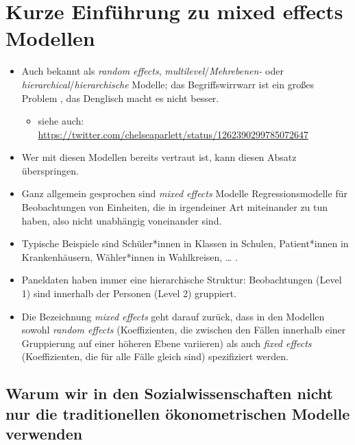 \documentclass[
]{book}
\providecommand{\tightlist}{%
  \setlength{\itemsep}{0pt}\setlength{\parskip}{0pt}}
\begin{document}
\hypertarget{kurze-einfuxfchrung-zu-mixed-effects-modellen}{%
\section{Kurze Einführung zu mixed effects Modellen}\label{kurze-einfuxfchrung-zu-mixed-effects-modellen}}

\begin{itemize}
\item
  Auch bekannt als \emph{random effects}, \emph{multilevel}/\emph{Mehrebenen-} oder \emph{hierarchical}/\emph{hierarchische} Modelle; das Begriffswirrwarr ist ein großes Problem \citep{gelmanDataAnalysisUsing2006}, das Denglisch macht es nicht besser.

  \begin{itemize}
  \tightlist
  \item
    siehe auch: \url{https://twitter.com/chelseaparlett/status/1262390299785072647}
  \end{itemize}
\item
  Wer mit diesen Modellen bereits vertraut ist, kann diesen Absatz überspringen.
\item
  Ganz allgemein gesprochen sind \emph{mixed effects} Modelle Regressionsmodelle für Beobachtungen von Einheiten, die in irgendeiner Art miteinander zu tun haben, also nicht unabhängig voneinander sind.
\item
  Typische Beispiele sind Schüler*innen in Klassen in Schulen, Patient*innen in Krankenhäusern, Wähler*innen in Wahlkreisen, \ldots{} .
\item
  Paneldaten haben immer eine hierarchische Struktur: Beobachtungen (Level 1) sind innerhalb der Personen (Level 2) gruppiert.
\item
  Die Bezeichnung \emph{mixed effects} geht darauf zurück, dass in den Modellen sowohl \emph{random effects} (Koeffizienten, die zwischen den Fällen innerhalb einer Gruppierung auf einer höheren Ebene variieren) als auch \emph{fixed effects} (Koeffizienten, die für alle Fälle gleich sind) spezifiziert werden.
\end{itemize}

\hypertarget{warum-wir-in-den-sozialwissenschaften-nicht-nur-die-traditionellen-uxf6konometrischen-modelle-verwenden}{%
\subsection*{Warum wir in den Sozialwissenschaften nicht nur die traditionellen ökonometrischen Modelle verwenden}\label{warum-wir-in-den-sozialwissenschaften-nicht-nur-die-traditionellen-uxf6konometrischen-modelle-verwenden}}
\end{document}
